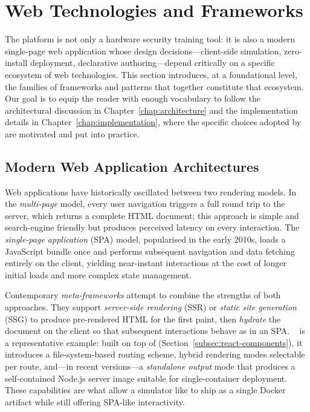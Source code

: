 \section{Web Technologies and Frameworks}\label{sec:web-frameworks}

The \pcbctf{} platform is not only a hardware security training tool: it is also a modern single-page web application whose design decisions---client-side simulation, zero-install deployment, declarative authoring---depend critically on a specific ecosystem of web technologies. This section introduces, at a foundational level, the families of frameworks and patterns that together constitute that ecosystem. Our goal is to equip the reader with enough vocabulary to follow the architectural discussion in Chapter~\ref{chap:architecture} and the implementation details in Chapter~\ref{chap:implementation}, where the specific choices adopted by \pcbctf{} are motivated and put into practice.

\subsection{Modern Web Application Architectures}\label{subsec:web-architectures}

Web applications have historically oscillated between two rendering models. In the \emph{multi-page} model, every user navigation triggers a full round trip to the server, which returns a complete HTML document; this approach is simple and search-engine friendly but produces perceived latency on every interaction. The \emph{single-page application} (SPA) model, popularised in the early 2010s, loads a JavaScript bundle once and performs subsequent navigation and data fetching entirely on the client, yielding near-instant interactions at the cost of longer initial loads and more complex state management.

Contemporary \emph{meta-frameworks} attempt to combine the strengths of both approaches. They support \emph{server-side rendering} (SSR) or \emph{static site generation} (SSG) to produce pre-rendered HTML for the first paint, then \emph{hydrate} the document on the client so that subsequent interactions behave as in an SPA. \nextjs{}~\cite{nextjs} is a representative example: built on top of \reactjs{} (Section~\ref{subsec:react-components}), it introduces a file-system-based routing scheme, hybrid rendering modes selectable per route, and---in recent versions---a \emph{standalone output} mode that produces a self-contained Node.js server image suitable for single-container deployment. These capabilities are what allow a simulator like \pcbctf{} to ship as a single Docker artifact while still offering SPA-like interactivity.

